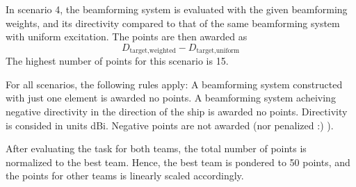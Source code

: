 \documentclass{article}[a4paper]
\begin{document}
In scenario 4, the beamforming system is evaluated with the given beamforming weights, and its directivity compared to that of the same beamforming system with uniform excitation. The points are then awarded as
\[ D_\textrm{target,weighted} - D_\textrm{target,uniform} \]
The highest number of points for this scenario is 15.

For all scenarios, the following rules apply: A beamforming system constructed with just one element is awarded no points. A beamforming system acheiving negative directivity in the direction of the ship is awarded no points. Directivity is consided in units dBi. Negative points are not awarded (nor penalized :) ).

After evaluating the task for both teams, the total number of points is normalized to the best team. Hence, the best team is pondered to 50 points, and the points for other teams is linearly scaled accordingly.
\end{document}
